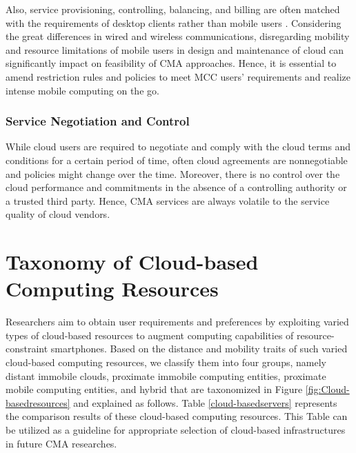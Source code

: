 \documentclass[publish]{IEEEtran}
\begin{document}
Also, service provisioning, controlling, balancing, and billing are often matched with the requirements of desktop clients rather than mobile users \cite{Kuhne2012}. Considering the great differences in wired and wireless communications, disregarding mobility and resource limitations of mobile users in design and maintenance of cloud can significantly impact on feasibility of CMA approaches. Hence, it is essential to amend restriction rules and policies to meet MCC users’ requirements and realize intense mobile computing on the go.

\subsubsection{Service Negotiation and Control}
While cloud users are required to negotiate and comply with the cloud terms and conditions for a certain period of time, often cloud agreements are nonnegotiable and policies might change over the time. Moreover, there is no control over the cloud performance and commitments in the absence of a controlling authority or a trusted third party. Hence, CMA services are always volatile to the service quality of cloud vendors.

\section{Taxonomy of Cloud-based Computing Resources}\label{cloud-based resources}
Researchers  \cite{Huerta-Canepa, cuervo2010maui,Satyanarayanan2009, Verbelen2012,Hung2012,Kempa, Kosta2011, Guo2011, A.Manjunatha2010,Zhang2011, Chun2011, Chun2009,March2011,Luo2009, Badidi2011, Liu2009, Kumar2010,Chuna,Lu2011,Kemp2010a, MOMCC, SAMI,Ma2012, Verbelen2012,Gu2012,Giurgiu2009} aim to obtain user requirements and preferences by exploiting varied types of cloud-based resources to augment computing capabilities of resource-constraint smartphones.  Based on the distance and mobility traits of such varied cloud-based computing resources, we classify them into four groups, namely distant immobile clouds, proximate immobile computing entities, proximate mobile computing entities, and hybrid that are taxonomized in Figure \ref{fig:Cloud-basedresources} and explained as follows. Table \ref{cloud-basedservers} represents the comparison results of these cloud-based computing resources. This Table can be utilized as a guideline for appropriate selection of cloud-based infrastructures in future CMA researches.  
\end{document}
